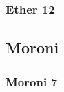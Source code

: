 	\subsubsection{Ether 12} %
	
		\begin{compactdesc}
		
		\item[12$\vert$]
		\begin{compactdesc}
		\item[my grace is sufficient for all men that humble themselves before me] 
		\end{compactdesc}
		
		\end{compactdesc}
		
\subsection{Moroni} %
	
	\subsubsection{Moroni 7} %
	
